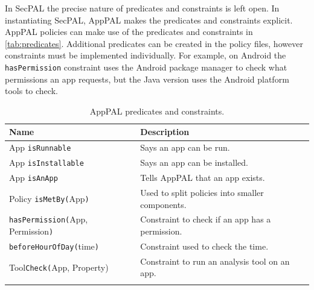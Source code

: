\documentclass[]{llncs}
\begin{document}
In SecPAL the precise nature of predicates and constraints is left open.
In instantiating SecPAL, AppPAL makes the predicates and constraints explicit.
AppPAL policies can make use of the predicates and constraints in \autoref{tab:predicates}.
Additional predicates can be created in the policy files, however constraints must be implemented individually.
For example, on Android the \texttt{hasPermission} constraint uses the Android package manager to check what permissions an app requests, but the Java version uses the Android platform tools to check.

\begin{table}
  \footnotesize
  \newcommand{\style}[1]{{\footnotesize #1}}
  \begin{tabulary}{\linewidth}{l L}
  \toprule
  \style{Name}                                             & \style{Description}                                                                                                                        \\
  \midrule
  \style{App \texttt{isRunnable}}                          & \style{Says an app can be run.}                                                                                                            \\
  \style{App \texttt{isInstallable}                      } & \style{Says an app can be installed.                                                                                                     } \\
  \style{App \texttt{isAnApp}                            } & \style{Tells AppPAL that an app exists.                                                                                                  } \\
  \style{Policy \texttt{isMetBy(}App\texttt{)}           } & \style{Used to split policies into smaller components.}                                                                                    \\
  \style{\texttt{hasPermission(}App, Permission\texttt{)}} & \style{Constraint to check if an app has a permission.                                                                                   } \\
  \style{\texttt{beforeHourOfDay(}time\texttt{)}         } & \style{Constraint used to check the time.                                                                                                } \\
  \style{Tool\texttt{Check(}App, Property)               } & \style{Constraint to run an analysis tool on an app.                                                                        }              \\
  \bottomrule \\
\end{tabulary}
\caption{AppPAL predicates and constraints.}
\label{tab:predicates}
\end{table}
\end{document}
